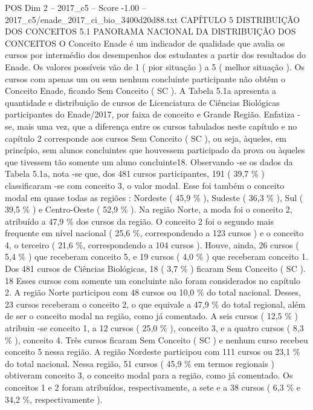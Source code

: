 \begin{textsample}{POS Dim 2 – 2017\_c5 – Score -1.00 – 2017\_c5/enade\_2017\_ci\_bio\_3400d20d88.txt}  \label{ex:f2_pos_385}
CAPÍTULO 5 DISTRIBUIÇÃO DOS CONCEITOS 5.1 PANORAMA NACIONAL DA DISTRIBUIÇÃO DOS CONCEITOS O Conceito Enade é um indicador de qualidade que avalia os cursos por intermédio dos desempenhos dos estudantes a partir dos resultados do Enade.
Os valores possíveis vão de 1 ( pior situação ) a 5 ( melhor situação ).
Os cursos com apenas um ou sem nenhum concluinte participante não obtêm o Conceito Enade, ficando Sem Conceito ( SC ).
A Tabela 5.1a apresenta a quantidade e distribuição de cursos de Licenciatura de Ciências Biológicas participantes do Enade/2017, por faixa de conceito e Grande Região.
Enfatiza -se, mais uma vez, que a diferença entre os cursos tabulados neste capítulo e no capítulo 2 corresponde aos cursos Sem Conceito ( SC ), ou seja, àqueles, em princípio, sem alunos concluintes que houvessem participado da prova ou àqueles que tivessem tão somente um aluno concluinte18.
Observando -se os dados da Tabela 5.1a, nota -se que, dos 481 cursos participantes, 191 ( 39,7 \% ) classificaram -se com conceito 3, o valor modal.
Esse foi também o conceito modal em quase todas as regiões : Nordeste ( 45,9 \% ), Sudeste ( 36,3 \% ), Sul ( 39,5 \% ) e Centro-Oeste ( 52,9 \% ).
Na região Norte, a moda foi o conceito 2, atribuído a 47,9 \% dos cursos da região.
O conceito 2 foi o segundo mais frequente em nível nacional ( 25,6 \%, correspondendo a 123 cursos ) e o conceito 4, o terceiro ( 21,6 \%, correspondendo a 104 cursos ).
Houve, ainda, 26 cursos ( 5,4 \% ) que receberam conceito 5, e 19 cursos ( 4,0 \% ) que receberam conceito 1.
Dos 481 cursos de Ciências Biológicas, 18 ( 3,7 \% ) ficaram Sem Conceito ( SC ). 18 Esses cursos com somente um concluinte não foram considerados no capítulo 2.
A região Norte participou com 48 cursos ou 10,0 \% do total nacional.
Desses, 23 cursos receberam o conceito 2, o que equivale a 47,9 \% do total regional, além de ser o conceito modal na região, como já comentado.
A seis cursos ( 12,5 \% ) atribuiu -se conceito 1, a 12 cursos ( 25,0 \% ), conceito 3, e a quatro cursos ( 8,3 \% ), conceito 4.
Três cursos ficaram Sem Conceito ( SC ) e nenhum curso recebeu conceito 5 nessa região.
A região Nordeste participou com 111 cursos ou 23,1 \% do total nacional.
Nessa região, 51 cursos ( 45,9 \% em termos regionais ) obtiveram conceito 3, o conceito modal para a região, como já comentado.
Os conceitos 1 e 2 foram atribuídos, respectivamente, a sete e a 38 cursos ( 6,3 \% e 34,2 \%, respectivamente ).

\end{textsample}
